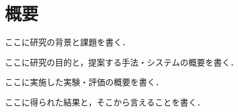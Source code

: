 \chapter*{概要}

ここに研究の背景と課題を書く．

ここに研究の目的と，提案する手法・システムの概要を書く．

ここに実施した実験・評価の概要を書く．

ここに得られた結果と，そこから言えることを書く．

\pagebreak
